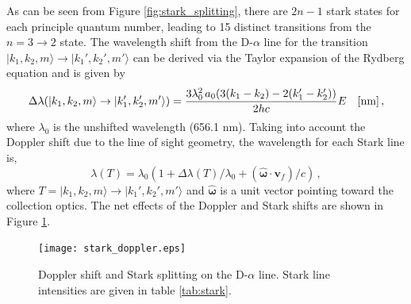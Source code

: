 As can be seen from Figure \ref{fig:stark_splitting}, there are $2n-1$ stark states for each principle quantum number, leading to 15 distinct transitions from the $n=3 \rightarrow 2$ state. The wavelength shift from the D-$\alpha$ line for the transition $|k_1,k_2,m\rangle \rightarrow |k_1',k_2',m'\rangle$ can be derived via the Taylor expansion of the Rydberg equation and is given by
\begin{equation}\label{eq:stark_lambda}
    \Delta \lambda(|k_1,k_2,m\rangle \rightarrow |k_1',k_2',m'\rangle) = \frac{3 \lambda_{0}^2\,a_0 (3(k_1-k_2) - 2(k_1' - k_2'))}{2hc} E \quad \rm{[nm]}\,,
\end{equation}
where $\lambda_0$ is the unshifted wavelength (656.1 nm).
Taking into account the Doppler shift due to the line of sight geometry, the wavelength for each Stark line is,
\begin{equation}\label{eq:wavelengths}
    \lambda(T) = \lambda_0 (1 + \Delta \lambda(T)/\lambda_0 + (\boldsymbol{\hat{\omega}} \cdot \mathbf{v}_f)/c)\,,
\end{equation}
where $T =|k_1,k_2,m\rangle \rightarrow |k_1',k_2',m'\rangle$ and $\boldsymbol{\hat{\omega}}$ is a unit vector pointing toward the collection optics. The net effects of the Doppler and Stark shifts are shown in Figure \ref{fig:stark_doppler}.
\begin{figure}[ht]
    \centering
    \texttt{[image: stark\_doppler.eps]}
    \caption{Doppler shift and Stark splitting on the D-$\alpha$ line. Stark line intensities are given in table \ref{tab:stark}.}
    \label{fig:stark_doppler}
\end{figure}

